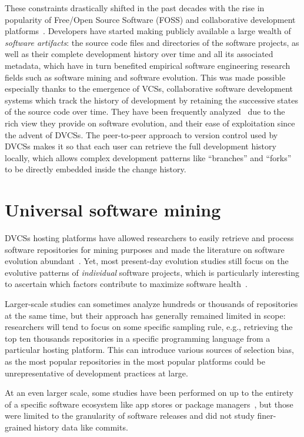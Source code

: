 These constraints drastically shifted in the past decades with the rise in
popularity of Free/Open Source Software (FOSS) and collaborative development
platforms~\cite{kalliamvakou2014promises}. Developers have started making
publicly available a large wealth of \emph{software artifacts}: the source code
files and directories of the software projects, as well as their complete
development history over time and all its associated metadata, which have in
turn benefited empirical software engineering research fields such as software
mining and software evolution. This was made possible especially thanks to the
emergence of \glspl{VCS}, collaborative software development systems which track
the history of development by retaining the successive states of the source
code over time. They have been frequently analyzed~\cite{kagdi2007msrsurvey}
due to the rich view they provide on software evolution, and their ease of
exploitation since the advent of \glspl{DVCS}. The peer-to-peer approach to
version control used by \glspl{DVCS} makes it so that each user can retrieve the
full development history locally, which allows complex development patterns
like ``branches'' and ``forks'' to be directly embedded inside the change
history.

\section{Universal software mining}

\glspl{DVCS} hosting platforms have allowed researchers to easily retrieve and
process software repositories for mining purposes and made the literature on
software evolution abundant~\cite{herraiz2013evolution}. Yet, most present-day
evolution studies still focus on the evolutive patterns of \emph{individual}
software projects, which is particularly interesting to ascertain which factors
contribute to maximize software health~\cite{DBLP:conf/icse/2018soheal}.

Larger-scale studies can sometimes analyze hundreds or thousands of
repositories at the same time, but their approach has generally remained
limited in scope: researchers will tend to focus on some specific sampling
rule, e.g., retrieving the top ten thousands repositories in a specific
programming language from a particular hosting platform. This can introduce
various sources of selection bias, as the most popular repositories in the most
popular platforms could be unrepresentative of development practices at large.

At an even larger scale, some studies have been performed on up to the entirety
of a specific software ecosystem like app stores or package
managers~\cite{gonzalez2009macro,debsources-ese-2016}, but those were limited
to the granularity of software releases and did not study finer-grained history
data like commits.

